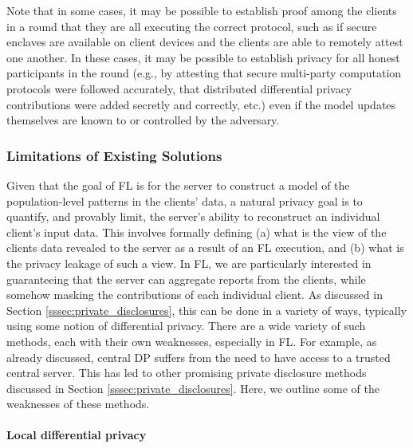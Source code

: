 \documentclass[11pt]{article}
\begin{document}
Note that in some cases, it may be possible to establish proof among the clients in a round that they are all executing the correct protocol, such as if secure enclaves are available on client devices and the clients are able to remotely attest one another.  In these cases, it may be possible to establish privacy for all honest participants in the round (e.g., by attesting that secure multi-party computation protocols were followed accurately, that distributed differential privacy contributions were added secretly and correctly, etc.) even if the model updates themselves are known to or controlled by the adversary.

\subsubsection{Limitations of Existing Solutions}
\label{sssec:limitations}
Given that the goal of FL is for the server to construct a model of the population-level patterns in the clients' data, a natural privacy goal is to quantify, and provably limit, the server's ability to reconstruct an individual client's input data. This involves formally defining (a) what is the view of the clients data revealed to the server as a result of an FL execution, and (b) what is the privacy leakage of such a view. In FL, we are particularly interested in guaranteeing that the server can aggregate reports from the clients, while somehow masking the contributions of each individual client. As discussed in Section \ref{sssec:private_disclosures}, this can be done in a variety of ways, typically using some notion of differential privacy. There are a wide variety of such methods, each with their own weaknesses, especially in FL. For example, as already discussed, central DP suffers from the need to have access to a trusted central server. This has led to other promising private disclosure methods discussed in Section \ref{sssec:private_disclosures}. Here, we outline some of the weaknesses of these methods.

\paragraph{Local differential privacy} 
\end{document}
